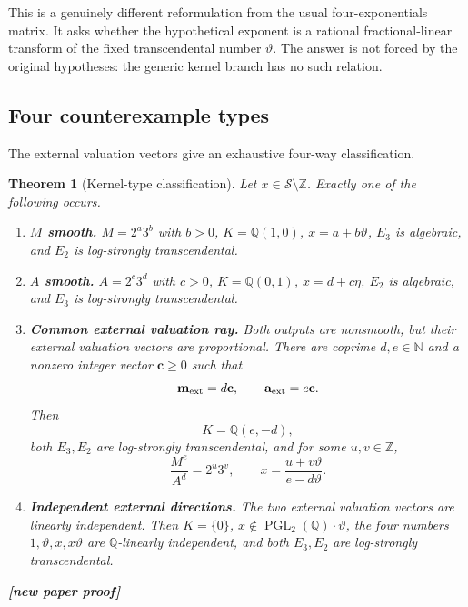 \documentclass[11pt,oneside]{article}
\newtheorem{theorem}{Theorem}[section]
\theoremstyle{definition}
\theoremstyle{remark}
\newcommand{\N}{\mathbb N}
\newcommand{\Z}{\mathbb Z}
\newcommand{\Q}{\mathbb Q}
\newcommand{\Sol}{\mathcal S}
\newcommand{\PGL}{\operatorname{PGL}}
\newcommand{\statusnew}{\textcolor{NewViolet}{\textbf{[new paper proof]}}}
\begin{document}
This is a genuinely different reformulation from the usual four-exponentials matrix.  It
asks whether the hypothetical exponent is a rational fractional-linear transform of the
fixed transcendental number $\vartheta$.  The answer is not forced by the original
hypotheses: the generic kernel branch has no such relation.

\subsection{Four counterexample types}\label{sec:kernel-types}

The external valuation vectors give an exhaustive four-way classification.

\begin{theorem}[Kernel-type classification]\label{thm:four-types}
Let $x\in\Sol\setminus\Z$.  Exactly one of the following occurs.

\begin{enumerate}[label=\textbf{Type \Roman*.}]
\item \textbf{$M$ smooth.}
      $M=2^a3^b$ with $b>0$, $K=\Q(1,0)$,
      $x=a+b\vartheta$, $E_3$ is algebraic, and $E_2$ is log-strongly transcendental.

\item \textbf{$A$ smooth.}
      $A=2^c3^d$ with $c>0$, $K=\Q(0,1)$,
      $x=d+c\eta$, $E_2$ is algebraic, and $E_3$ is log-strongly transcendental.

\item \textbf{Common external valuation ray.}
      Both outputs are nonsmooth, but their external valuation vectors are proportional.
      There are coprime $d,e\in\N$ and a nonzero integer vector $\mathbf c\ge0$ such that
      \[
        \mathbf m_{\rm ext}=d\mathbf c,
        \qquad
        \mathbf a_{\rm ext}=e\mathbf c.
      \]
      Then
      \[
        K=\Q(e,-d),
      \]
      both $E_3,E_2$ are log-strongly transcendental, and for some $u,v\in\Z$,
      \[
        \frac{M^e}{A^d}=2^u3^v,
        \qquad
        x=\frac{u+v\vartheta}{e-d\vartheta}.             \tag{8.5}\label{eq:common-core-mobius}
      \]

\item \textbf{Independent external directions.}
      The two external valuation vectors are linearly independent.  Then $K=\{0\}$,
      $x\notin\PGL_2(\Q)\cdot\vartheta$, the four numbers
      $1,\vartheta,x,x\vartheta$ are $\Q$-linearly independent, and both
      $E_3,E_2$ are log-strongly transcendental.
\end{enumerate}
\statusnew
\end{theorem}
\end{document}

